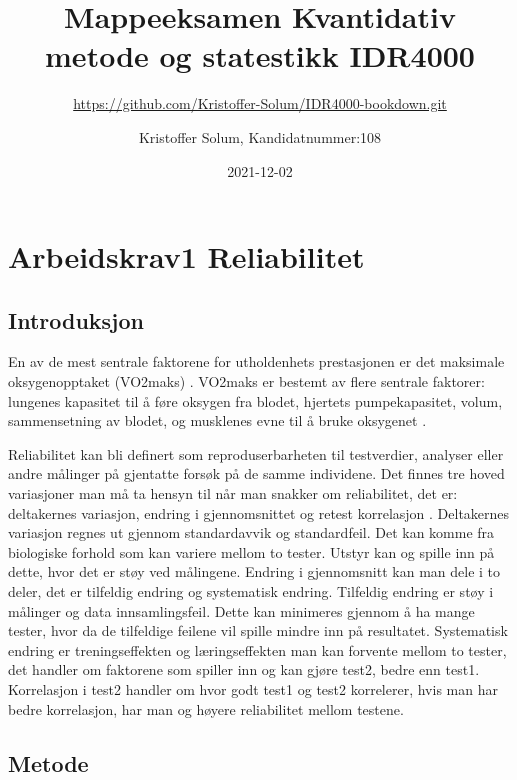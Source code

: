 \documentclass[
]{book}
\title{Mappeeksamen Kvantidativ metode og statestikk IDR4000}
\subtitle{\url{https://github.com/Kristoffer-Solum/IDR4000-bookdown.git}}
\author{Kristoffer Solum, Kandidatnummer:108}
\date{2021-12-02}
\begin{document}
\maketitle

{
\setcounter{tocdepth}{1}
\tableofcontents
}
\hypertarget{arbeidskrav1-reliabilitet}{%
\chapter{Arbeidskrav1 Reliabilitet}\label{arbeidskrav1-reliabilitet}}

\hypertarget{introduksjon}{%
\section{Introduksjon}\label{introduksjon}}

En av de mest sentrale faktorene for utholdenhets prestasjonen er det maksimale oksygenopptaket (VO2maks) \citet{bassett2000}. VO2maks er bestemt av flere sentrale faktorer: lungenes kapasitet til å føre oksygen fra blodet, hjertets pumpekapasitet, volum, sammensetning av blodet, og musklenes evne til å bruke oksygenet \citet{bassett2000}.

Reliabilitet kan bli definert som reproduserbarheten til testverdier, analyser eller andre målinger på gjentatte forsøk på de samme individene. Det finnes tre hoved variasjoner man må ta hensyn til når man snakker om reliabilitet, det er: deltakernes variasjon, endring i gjennomsnittet og retest korrelasjon \citet{hopkins2000}. Deltakernes variasjon regnes ut gjennom standardavvik og standardfeil. Det kan komme fra biologiske forhold som kan variere mellom to tester. Utstyr kan og spille inn på dette, hvor det er støy ved målingene. Endring i gjennomsnitt kan man dele i to deler, det er tilfeldig endring og systematisk endring. Tilfeldig endring er støy i målinger og data innsamlingsfeil. Dette kan minimeres gjennom å ha mange tester, hvor da de tilfeldige feilene vil spille mindre inn på resultatet. Systematisk endring er treningseffekten og læringseffekten man kan forvente mellom to tester, det handler om faktorene som spiller inn og kan gjøre test2, bedre enn test1. Korrelasjon i test2 handler om hvor godt test1 og test2 korrelerer, hvis man har bedre korrelasjon, har man og høyere reliabilitet mellom testene.

\hypertarget{metode}{%
\section{Metode}\label{metode}}
\end{document}
